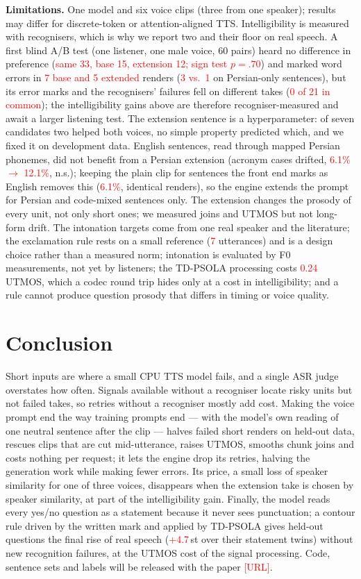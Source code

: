 \documentclass[conference]{IEEEtran}
\newcommand{\RES}[1]{\textcolor{red}{#1}}
\begin{document}
\textbf{Limitations.} One model and six voice clips (three from one speaker); results may differ for discrete-token or
attention-aligned TTS. Intelligibility is measured with recognisers, which is why we report two and their
floor on real speech. A first blind A/B test (one listener, one male voice, 60 pairs) heard no difference
in preference (\RES{same 33, base 15, extension 12; sign test $p=.70$}) and marked word errors in \RES{7 base
and 5 extended} renders (\RES{3 vs.\ 1} on Persian-only sentences), but its error marks and the
recognisers' failures fell on different takes (\RES{0 of 21 in common}); the intelligibility gains above
are therefore recogniser-measured and await a larger listening test. The
extension sentence is a hyperparameter: of seven candidates two helped both voices, no simple property
predicted which, and we fixed it on development data. English sentences, read through mapped Persian phonemes, did not benefit from a Persian
extension (acronym cases drifted, \RES{6.1\% $\to$ 12.1\%}, n.s.); keeping the plain clip for sentences the
front end marks as English removes this (\RES{6.1\%}, identical renders), so the engine extends the prompt
for Persian and code-mixed sentences only. The extension changes the prosody of every unit, not only short
ones; we measured joins and UTMOS but not long-form drift. The intonation targets come from one real
speaker and the literature; the exclamation rule rests on a small reference (\RES{7} utterances) and is a
design choice rather than a measured norm; intonation is evaluated by F0 measurements, not yet by
listeners; the TD-PSOLA processing costs \RES{0.24} UTMOS, which a codec round trip hides only at a cost in
intelligibility; and a rule cannot produce question prosody that differs in timing or voice quality.

\section{Conclusion}
Short inputs are where a small CPU TTS model fails, and a single ASR judge overstates how often. Signals
available without a recogniser locate risky units but not failed takes, so retries without a recogniser
mostly add cost. Making the voice prompt end the way training prompts end --- with the model's own reading of
one neutral sentence after the clip --- halves failed short renders on held-out data, rescues clips that
are cut mid-utterance, raises UTMOS, smooths chunk joins and costs nothing per request; it lets the engine drop its retries, halving the generation work
while making fewer errors. Its price, a small loss of speaker similarity for one of three voices, disappears when the
extension take is chosen by speaker similarity, at part of the intelligibility gain. Finally, the model
reads every yes/no question as a statement because it never sees punctuation; a contour rule driven by the
written mark and applied by TD-PSOLA gives held-out questions the final rise of real speech (\RES{+4.7}\,st
over their statement twins) without new recognition failures, at the UTMOS cost of the signal processing.
Code,
sentence sets and labels will be released with the paper \RES{[URL]}.



\end{document}
